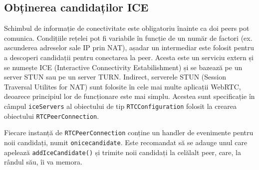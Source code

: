 \subsection{Obținerea candidaților ICE}
\label{sec:ch3sec4subsec4}

\indent \par Schimbul de informație de conectivitate este obligatoriu înainte ca doi peers pot comunica. Condițiile rețelei pot fi variabile în funcție de un număr de factori (ex. ascunderea adreselor sale IP prin NAT), așadar un intermediar este folosit pentru a descoperi candidații pentru conectarea la peer. Acesta este un serviciu extern și se numește ICE (Interactive Connectivity Estabilishment) și se bazează pe un server STUN sau pe un server TURN. Indirect, serverele STUN (Session Traversal Utilites for NAT) sunt folosite în cele mai multe aplicații WebRTC, deoarece principiul lor de funcționare este mai simplu. Acestea sunt specificație în câmpul \texttt{iceServers} al obiectului de tip \texttt{RTCConfiguration} folosit la crearea obiectului \texttt{RTCPeerConnection}.
\indent \par Fiecare instanță de \texttt{RTCPeerConnection} conține un handler de evenimente pentru noii candidați, numit \texttt{onicecandidate}. Este recomandat să se adauge unul care apelează \texttt{addIceCandidate()} și trimite noii candidați la celălalt peer, care, la rândul său, îi va memora.
